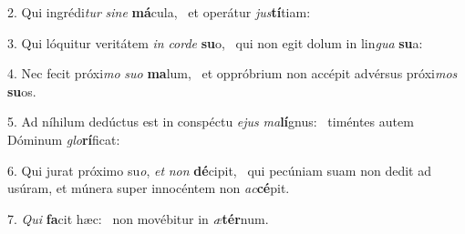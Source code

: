 2. Qui ingrédi\textit{tur} \textit{si}\textit{ne} \textbf{má}cula, \ast\  et operátur \textit{jus}\textbf{tí}tiam:\

3. Qui lóquitur veritátem \textit{in} \textit{cor}\textit{de} \textbf{su}o, \ast\  qui non egit dolum in lin\textit{gua} \textbf{su}a:\

4. Nec fecit próxi\textit{mo} \textit{su}\textit{o} \textbf{ma}lum, \ast\  et oppróbrium non accépit advérsus próxi\textit{mos} \textbf{su}os.\

5. Ad níhilum dedúctus est in conspéctu \textit{e}\textit{jus} \textit{ma}\textbf{lí}gnus: \ast\  timéntes autem Dóminum \textit{glo}\textbf{rí}ficat:\

6. Qui jurat próximo su\textit{o}, \textit{et} \textit{non} \textbf{dé}cipit, \ast\  qui pecúniam suam non dedit ad usúram, et múnera super innocéntem non \textit{ac}\textbf{cé}pit.\

7. \textit{Qui} \textbf{fa}cit hæc: \ast\  non movébitur in \textit{æ}\textbf{tér}num.\

